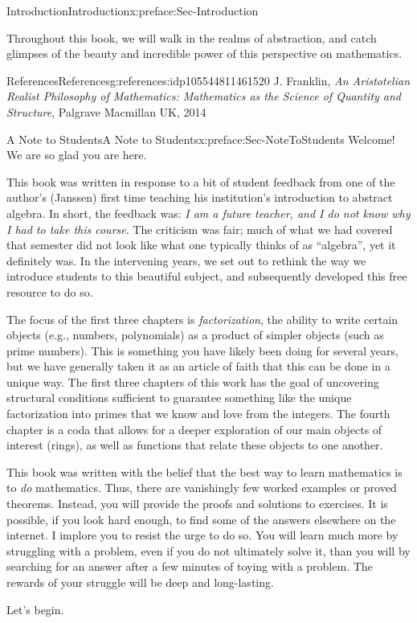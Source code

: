 \documentclass[oneside,10pt,]{book}
\numberwithin{equation}{section}
\begin{document}
\begin{preface}{Introduction}{}{Introduction}{}{}{x:preface:Sec-Introduction}
\par
Throughout this book, we will walk in the realms of abstraction, and catch glimpses of the beauty and incredible power of this perspective on mathematics.%
%
%
\typeout{************************************************}
\typeout{************************************************}
%
\begin{references-}{References}{}{References}{}{}{g:references:idp105544811461520}
J. Franklin, \emph{An Aristotelian Realist Philosophy of Mathematics: Mathematics as the Science of Quantity and Structure}, Palgrave Macmillan UK, 2014\end{references-}
\end{preface}
%
%
\typeout{************************************************}
\typeout{************************************************}
%
\begin{preface}{A Note to Students}{}{A Note to Students}{}{}{x:preface:Sec-NoteToStudents}
Welcome! We are so glad you are here.%
\par
This book was written in response to a bit of student feedback from one of the author's (Janssen) first time teaching his institution's introduction to abstract algebra. In short, the feedback was: \emph{I am a future teacher, and I do not know why I had to take this course}. The criticism was fair; much of what we had covered that semester did not look like what one typically thinks of as ``algebra'', yet it definitely was. In the intervening years, we set out to rethink the way we introduce students to this beautiful subject, and subsequently developed this free resource to do so.%
\par
The focus of the first three chapters is \emph{factorization}, the ability to write certain objects (e.g., numbers, polynomials) as a product of simpler objects (such as prime numbers). This is something you have likely been doing for several years, but we have generally taken it as an article of faith that this can be done in a unique way. The first three chapters of this work has the goal of uncovering structural conditions sufficient to guarantee something like the unique factorization into primes that we know and love from the integers. The fourth chapter is a coda that allows for a deeper exploration of our main objects of interest (rings), as well as functions that relate these objects to one another.%
\par
This book was written with the belief that the best way to learn mathematics is to \emph{do} mathematics. Thus, there are vanishingly few worked examples or proved theorems. Instead, you will provide the proofs and solutions to exercises. It is possible, if you look hard enough, to find some of the answers elsewhere on the internet. I implore you to resist the urge to do so. You will learn much more by struggling with a problem, even if you do not ultimately solve it, than you will by searching for an answer after a few minutes of toying with a problem. The rewards of your struggle will be deep and long-lasting.%
\par
Let's begin.%
\end{preface}
\end{document}
